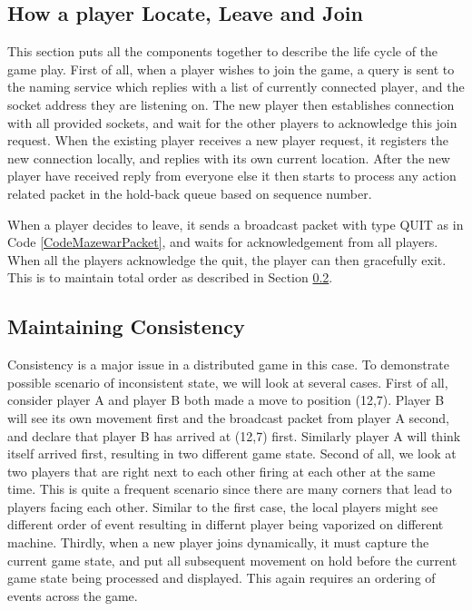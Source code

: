 \subsection{How a player Locate, Leave and Join}\label{DesignGameFlow}

This section puts all the components together to describe the life cycle of the game play. First of all, when a player wishes to join the game, a query is sent to the naming service which replies with a list of currently connected player, and the socket address they are listening on. The new player then establishes connection with all provided sockets, and wait for the other players to acknowledge this join request. When the existing player receives a new player request, it registers the new connection locally, and replies with its own current location. After the new player have received reply from everyone else it then starts to process any action related packet in the hold-back queue based on sequence number.

When a player decides to leave, it sends a broadcast packet with type QUIT as in Code \ref{CodeMazewarPacket}, and waits for acknowledgement from all players. When all the players acknowledge the quit, the player can then gracefully exit. This is to maintain total order as described in Section \ref{DesignConsistency}.

\subsection{Maintaining Consistency}\label{DesignConsistency}

Consistency is a major issue in a distributed game in this case. To demonstrate possible scenario of inconsistent state, we will look at several cases. First of all, consider player A and player B both made a move to position (12,7). Player B will see its own movement first and the broadcast packet from player A second, and declare that player B has arrived at (12,7) first. Similarly player A will think itself arrived first, resulting in two different game state. Second of all, we look at two players that are right next to each other firing at each other at the same time. This is quite a frequent scenario since there are many corners that lead to players facing each other. Similar to the first case, the local players might see different order of event resulting in differnt player being vaporized on different machine. Thirdly, when a new player joins dynamically, it must capture the current game state, and put all subsequent movement on hold before the current game state being processed and displayed. This again requires an ordering of events across the game.


